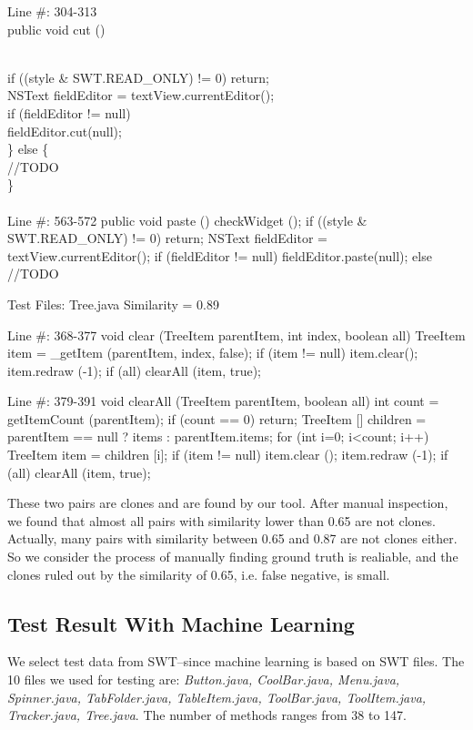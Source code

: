 \documentclass[../main.tex]{subfiles}
\begin{document}
Line \#: 304-313 \\
public void cut () { \\
	if ((style \& SWT.READ\_ONLY) != 0) return; \\ \indent
	NSText fieldEditor = textView.currentEditor(); \\
	if (fieldEditor != null) { \\ \indent
		fieldEditor.cut(null); \\
	\} else \{ \\ \indent
		//TODO \\
	\} \\
} \\

Line \#: 563-572
public void paste () {
	checkWidget ();
	if ((style \& SWT.READ\_ONLY) != 0) return;
	NSText fieldEditor = textView.currentEditor();
	if (fieldEditor != null) {
		fieldEditor.paste(null);
	} else {
		//TODO
	}
}

Test Files: Tree.java
Similarity = 0.89

Line \#: 368-377
void clear (TreeItem parentItem, int index, boolean all) {
	TreeItem item = \_getItem (parentItem, index, false);
	if (item != null) {
		item.clear();
		item.redraw (-1);
		if (all) {
			clearAll (item, true);
		}
	}
}

Line \#: 379-391
void clearAll (TreeItem parentItem, boolean all) {
	int count = getItemCount (parentItem);
	if (count == 0) return;
	TreeItem [] children = parentItem == null ? items : parentItem.items; 
	for (int i=0; i<count; i++) {
		TreeItem item = children [i];
		if (item != null) {
			item.clear ();
			item.redraw (-1);
			if (all) clearAll (item, true);
		}
	}
}

These two pairs are clones and are found by our tool. After manual inspection, we found that almost all pairs with similarity lower than 0.65 are not clones. Actually, many pairs with similarity between 0.65 and 0.87 are not clones either. So we consider the process of manually finding ground truth is realiable, and the clones ruled out by the similarity of 0.65, i.e. false negative, is small.

\subsection{Test Result With Machine Learning}

We select test data from SWT--since machine learning is based on SWT files. The 10 files we used for testing are: \textit{Button.java, CoolBar.java, Menu.java, Spinner.java, TabFolder.java, TableItem.java, ToolBar.java, ToolItem.java, Tracker.java, Tree.java}. The number of methods ranges from 38 to 147.

}
\end{document}
